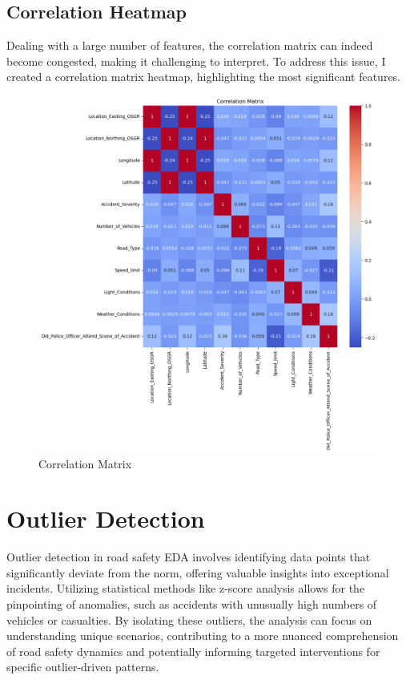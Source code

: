 \documentclass{article}
\begin{document}
\subsection{Correlation Heatmap}
Dealing with a large number of features, the correlation matrix can indeed become congested, making it challenging
to interpret. To address this issue, I created a correlation matrix heatmap, highlighting the most significant
features.

\begin{figure}[ht]
  \centering
  \includegraphics[width=1\textwidth]{Images/correlation_matrix.png}
  \caption{Correlation Matrix}
\end{figure}

\section{Outlier Detection}
Outlier detection in road safety EDA involves identifying data points that significantly deviate from the norm,
offering valuable insights into exceptional incidents. Utilizing statistical methods like z-score analysis allows
for the pinpointing of anomalies, such as accidents with unusually high numbers of vehicles or casualties. By
isolating these outliers, the analysis can focus on understanding unique scenarios, contributing to a more
nuanced comprehension of road safety dynamics and potentially informing targeted interventions for specific
outlier-driven patterns.
\end{document}
